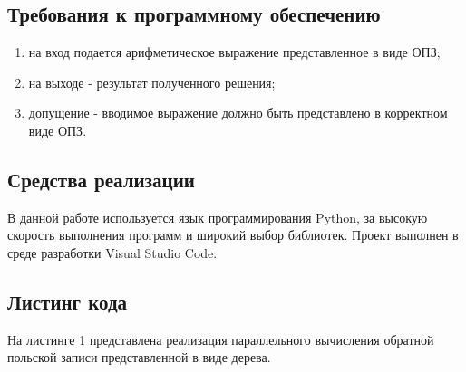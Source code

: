 \documentclass[a4paper, 12pt]{article}
\begin{document}
	\subsection{Требования к программному обеспечению}
		\begin{enumerate}
		\item на вход подается арифметическое выражение представленное в виде ОПЗ;
		\item на выходе - результат полученного решения;
		\item допущение - вводимое выражение должно быть представлено в корректном виде ОПЗ. 
	\end{enumerate}
	\subsection{Средства реализации}
	\hspace*{5mm} В данной работе используется язык программирования Python, за высокую скорость выполнения программ и широкий выбор библиотек.\cite{doc} Проект выполнен в среде разработки Visual Studio Code.
	\subsection{Листинг кода}
	На листинге 1 представлена реализация параллельного вычисления обратной польской записи представленной в виде дерева.


	\lstset{style=mystyle}
\end{document}
